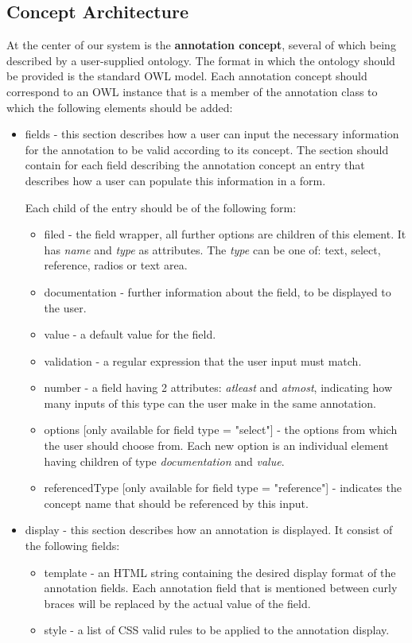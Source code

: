 \subsection{Concept Architecture}
At the center of our system is the \textbf{annotation concept}, several of which being
described by a user-supplied ontology. The format in which the ontology should be provided
is the standard OWL model.  Each annotation concept should correspond to an OWL instance
that is a member of the annotation class to which the following elements should be added:
\begin{itemize}
\item fields - this section describes how a user can input the necessary information for
  the annotation to be valid according to its concept. The section should contain for each
  field describing the annotation concept an entry that describes how a user can populate
  this information in a form.
  
  Each child of the entry should be of the following form:
  \begin{itemize}
  \item filed - the field wrapper, all further options are children of this element. It
    has \textit{name} and \textit{type} as attributes. The \textit{type} can be one of:
    text, select, reference, radios or text area.
  \item documentation - further information about the field, to be displayed to the user.
  \item value - a default value for the field.
  \item validation - a regular expression that the user input must match.
  \item number - a field having 2 attributes: \textit{atleast} and \textit{atmost},
    indicating how many inputs of this type can the user make in the same annotation.
  \item options [only available for field type = "select"] - the options from which the
    user should choose from. Each new option is an individual element having children of
    type \textit{documentation} and \textit{value}.
  \item referencedType [only available for field type = "reference"] - indicates the
    concept name that should be referenced by this input.
  \end{itemize}
\item display - this section describes how an annotation is displayed. It consist of the
  following fields:
  \begin{itemize}
  \item template - an HTML string containing the desired display format of the annotation
    fields. Each annotation field that is mentioned between curly braces will be replaced
    by the actual value of the field.
  \item style - a list of CSS valid rules to be applied to the annotation display.
  \end{itemize}
\end{itemize}

